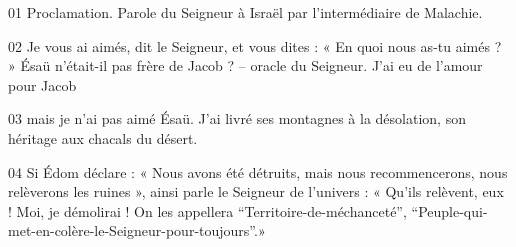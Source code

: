 01 Proclamation. Parole du Seigneur à Israël par l’intermédiaire de Malachie.

02 Je vous ai aimés, dit le Seigneur, et vous dites : « En quoi nous as-tu aimés ? » Ésaü n’était-il pas frère de Jacob ? – oracle du Seigneur. J’ai eu de l’amour pour Jacob

03 mais je n’ai pas aimé Ésaü. J’ai livré ses montagnes à la désolation, son héritage aux chacals du désert.

04 Si Édom déclare : « Nous avons été détruits, mais nous recommencerons, nous relèverons les ruines », ainsi parle le Seigneur de l’univers : « Qu’ils relèvent, eux ! Moi, je démolirai ! On les appellera “Territoire-de-méchanceté”, “Peuple-qui-met-en-colère-le-Seigneur-pour-toujours”.»
